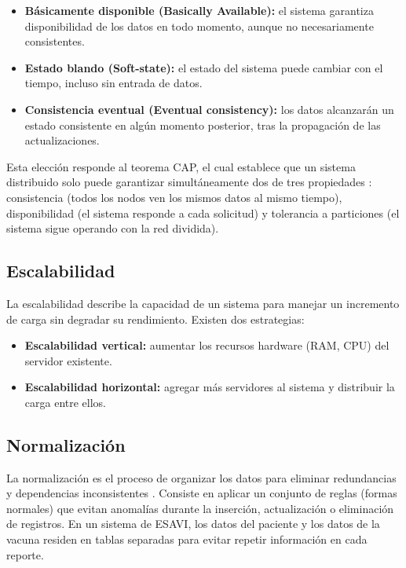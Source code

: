 \begin{itemize}
    \item \textbf{Básicamente disponible (Basically Available):} el sistema garantiza disponibilidad de los datos en todo momento, aunque no necesariamente consistentes.
    \item \textbf{Estado blando (Soft-state):} el estado del sistema puede cambiar con el tiempo, incluso sin entrada de datos.
    \item \textbf{Consistencia eventual (Eventual consistency):} los datos alcanzarán un estado consistente en algún momento posterior, tras la propagación de las actualizaciones.
\end{itemize}

Esta elección responde al teorema CAP, el cual establece que un sistema distribuido solo puede garantizar simultáneamente dos de tres propiedades \cite{ibm_cap_theorem}: consistencia (todos los nodos ven los mismos datos al mismo tiempo), disponibilidad (el sistema responde a cada solicitud) y tolerancia a particiones (el sistema sigue operando con la red dividida).

\subsection{Escalabilidad}

La escalabilidad describe la capacidad de un sistema para manejar un incremento de carga sin degradar su rendimiento. Existen dos estrategias:

\begin{itemize}
    \item \textbf{Escalabilidad vertical:} aumentar los recursos hardware (RAM, CPU) del servidor existente. 
    \item \textbf{Escalabilidad horizontal:} agregar más servidores al sistema y distribuir la carga entre ellos. 
\end{itemize}

\subsection{Normalización}

La normalización es el proceso de organizar los datos para eliminar redundancias y dependencias inconsistentes \cite{codd1970}. 
Consiste en aplicar un conjunto de reglas (formas normales) que evitan anomalías durante la inserción, actualización o eliminación de registros. 
En un sistema de ESAVI, los datos del paciente y los datos de la vacuna residen en tablas separadas para evitar repetir información en cada reporte.


